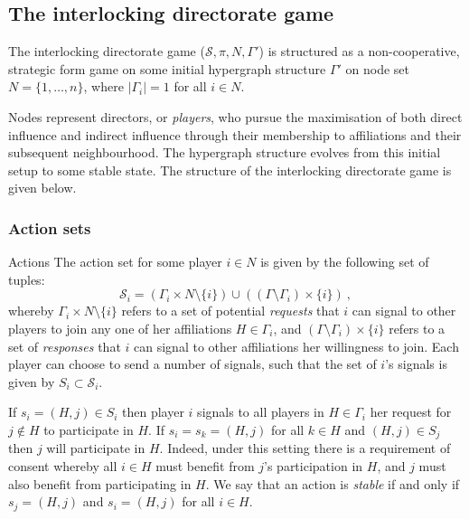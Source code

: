 \documentclass[11pt,fleqn]{article}
\begin{document}
\subsection{The interlocking directorate game}

The interlocking directorate game ($\mathcal{S}, \pi, N, \Gamma'$) is structured as a non-cooperative, strategic form game on some initial hypergraph structure $\Gamma'$ on node set $N = \{1,\ldots,n\}$, where $| \Gamma_{i} | = 1$ for all $i \in N$.

Nodes represent directors, or \emph{players}, who pursue the maximisation of both direct influence and indirect influence through their membership to affiliations and their subsequent neighbourhood. The hypergraph structure evolves from this initial setup to some stable state. The structure of the interlocking directorate game is given below.

\subsubsection*{Action sets}

Actions The action set for some player $i \in N$ is given by the following set of tuples:
\begin{equation}
\mathcal{S}_{i} = \left( \Gamma_{i} \times N \setminus \{i\} \right) \cup \left( \left( \Gamma \setminus \Gamma_{i} \right) \times \{i\} \right) ~ ,
\end{equation}
whereby $\Gamma_{i} \times N \setminus \{i\}$ refers to a set of potential \emph{requests} that $i$ can signal to other players to join any one of her affiliations $H \in \Gamma_{i}$, and $\left( \Gamma \setminus \Gamma_{i} \right) \times \{i\}$ refers to a set of \emph{responses} that $i$ can signal to other affiliations her willingness to join. Each player can choose to send a number of signals, such that the set of $i$'s signals is given by $S_{i} \subset \mathcal{S}_{i}$.

If $s_{i} = (H,j) \in S_{i}$ then player $i$ signals to all players in $H \in \Gamma_{i}$ her request for $j \notin H$ to participate in $H$. If $s_{i} = s_{k} = (H,j)$ for all $k \in H$ and $(H,j) \in S_{j}$ then $j$ will participate in $H$. Indeed, under this setting there is a requirement of consent whereby all $i \in H$ must benefit from $j$'s participation in $H$, and $j$ must also benefit from participating in $H$. We say that an action is \emph{stable} if and only if $s_{j} = (H,j)$ and $s_{i} = (H,j)$ for all $i \in H$.
\end{document}
